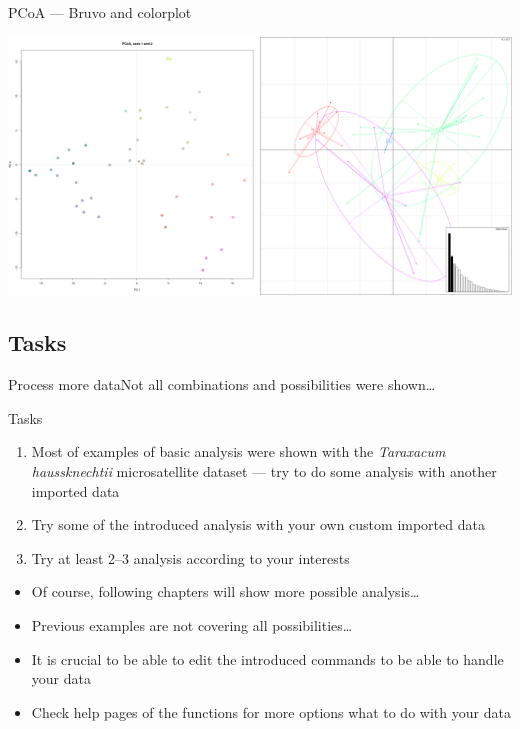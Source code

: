 \documentclass[compress, ucs, xelatex, 11pt, xcolor=svgnames, aspectratio=169,
	hyperref={
		bookmarks=true,
		unicode=true,
		colorlinks=true,
		pdftitle={Molecular data in R},
		plainpages=false,
		pdfauthor={Vojtech Zeisek},
		pdfsubject={Course about phylogeny and evolution in R},
		pdfcreator={XeLaTeX},
		pdfkeywords={R, evolution, phylogeny, molecular data},
		linkcolor=Crimson, %
		anchorcolor=Magenta, %
		citecolor=Magenta, %
		filecolor=Magenta, %
		menucolor=Magenta, %
		urlcolor=DodgerBlue, %
		pdftex},
	url={hyphens, lowtilde} %
	]{beamer}
\begin{document}
\begin{frame}{PCoA --- Bruvo and colorplot}
	\begin{center}
		\includegraphics[width=\textwidth-2.5cm]{pcoa-dalsi.png}
	\end{center}
\end{frame}

\subsection{Tasks}

\begin{frame}{Process more data}{Not all combinations and possibilities were shown\ldots}
	\begin{exampleblock}{Tasks}
		\begin{enumerate}
			\item Most of examples of basic analysis were shown with the \textit{Taraxacum haussknechtii} microsatellite dataset --- try to do some analysis with another imported data
			\item Try some of the introduced analysis with your own custom imported data
			\item Try at least 2--3 analysis according to your interests
		\end{enumerate}
	\end{exampleblock}
	\begin{itemize}
		\item Of course, following chapters will show more possible analysis\ldots
		\item Previous examples are not covering all possibilities\ldots
		\item It is crucial to be able to edit the introduced commands to be able to handle your data
		\item Check help pages of the functions for more options what to do with your data
	\end{itemize}
\end{frame}
\end{document}
